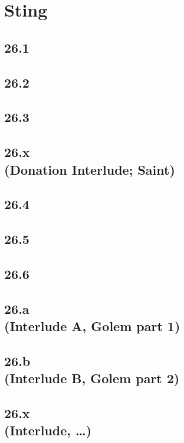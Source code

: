 \part{Sting}
 \chapter{26.1}
 \chapter{26.2}
 \chapter{26.3}
 \chapter[26.x (Donation Interlude; Saint)]{26.x\\(Donation Interlude; Saint)}
 \chapter{26.4}
 \chapter{26.5}
 \chapter{26.6}
 \chapter[26.a (Interlude A, Golem part 1)]{26.a\\(Interlude A, Golem part 1)}
 \chapter[26.b (Interlude B, Golem part 2)]{26.b\\(Interlude B, Golem part 2)}
 \chapter[26.x (Interlude, …)]{26.x\\(Interlude, …)}











